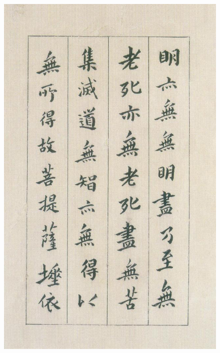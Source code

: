 \documentclass[a4paper,twoside]{article}
\begin{document}
\begin{figure}[ht]
\centering
\includegraphics[width=13.8cm]{images/fushan-4}
\end{figure}
\end{document}

